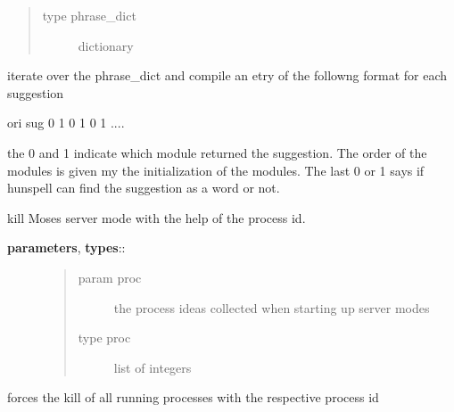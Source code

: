 \documentclass[letterpaper,10pt,english]{sphinxmanual}
\begin{document}
\begin{fulllineitems}
\begin{fulllineitems}
\begin{description}
\begin{quote}
\begin{description}
\item[{type phrase\_dict}] \leavevmode
dictionary

\end{description}\end{quote}

\end{description}

iterate over the phrase\_dict and compile an etry of the followng format for each 
suggestion

ori \textbar{}\textbar{}\textbar{} sug \textbar{}\textbar{}\textbar{} 0 1 0 1 0 1 ....

the 0 and 1 indicate which module returned the suggestion. The order of the modules is 
given my the initialization of the modules.
The last 0 or 1 says if hunspell can find the suggestion as a word or not.

\end{fulllineitems}


\begin{fulllineitems}
\label{API:norm.normalizer.Normalizer._kill_server_mode}
kill Moses server mode with the help of the process id.
\begin{description}
\item[{\textbf{parameters}, \textbf{types}::}] \leavevmode\begin{quote}\begin{description}
\item[{param proc}] \leavevmode
the process ideas collected when starting up server modes

\item[{type proc}] \leavevmode
list of integers

\end{description}\end{quote}

\end{description}

forces the kill of all running processes with the respective process id

\end{fulllineitems}



\end{fulllineitems}
\end{document}
